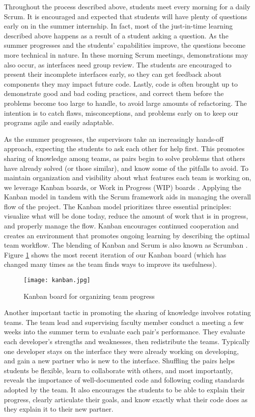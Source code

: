 Throughout the process described above, students meet every morning for a daily Scrum. It is encouraged and expected that students will have plenty of questions early on in the summer internship. In fact, most of the just-in-time learning described above happens as a result of a student asking a question. As the summer progresses and the students' capabilities improve, the questions become more technical in nature. In these morning Scrum meetings, demonstrations may also occur, as interfaces need group review. The students are encouraged to present their incomplete interfaces early, so they can get feedback about components they may impact future code. Lastly, code is often brought up to demonstrate good and bad coding practices, and correct them before the problems become too large to handle, to avoid large amounts of refactoring. The intention is to catch flaws, misconceptions, and problems early on to keep our programs agile and easily adaptable.

As the summer progresses, the supervisors take an increasingly hands-off approach, expecting the students to ask each other for help first. This promotes sharing of knowledge among teams, as pairs begin to solve problems that others have already solved (or those similar), and know some of the pitfalls to avoid. To maintain organization and visibility about what features each team is working on, we leverage Kanban boards, or Work in Progress (WIP) boards \cite{anderson2010kanban}. Applying the Kanban model in tandem with the Scrum framework aids in managing the overall flow of the project. The Kanban model prioritizes three essential principles: visualize what will be done today, reduce the amount of work that is in progress, and properly manage the flow. Kanban encourages continued cooperation and creates an environment that promotes ongoing learning by describing the optimal team workflow. The blending of Kanban and Scrum is also known as Scrumban \cite{ladas2009scrumban}. Figure \ref{kanban} shows the most recent iteration of our Kanban board (which has changed many times as the team finds ways to improve its usefulness).
\begin{figure}[h]
 \centering
 \texttt{[image: kanban.jpg]}
 \caption{Kanban board for organizing team progress}
 \label{kanban}
\end{figure}

Another important tactic in promoting the sharing of knowledge involves rotating teams. The team lead and supervising faculty member conduct a meeting a few weeks into the summer term to evaluate each pair's performance. They evaluate each developer's strengths and weaknesses, then redistribute the teams. Typically one developer stays on the interface they were already working on developing, and gain a new partner who is new to the interface. Shuffling the pairs helps students be flexible, learn to collaborate with others, and most importantly, reveals the importance of well-documented code and following coding standards adopted by the team. It also encourages the students to be able to explain their progress, clearly articulate their goals, and know exactly what their code does as they explain it to their new partner.

